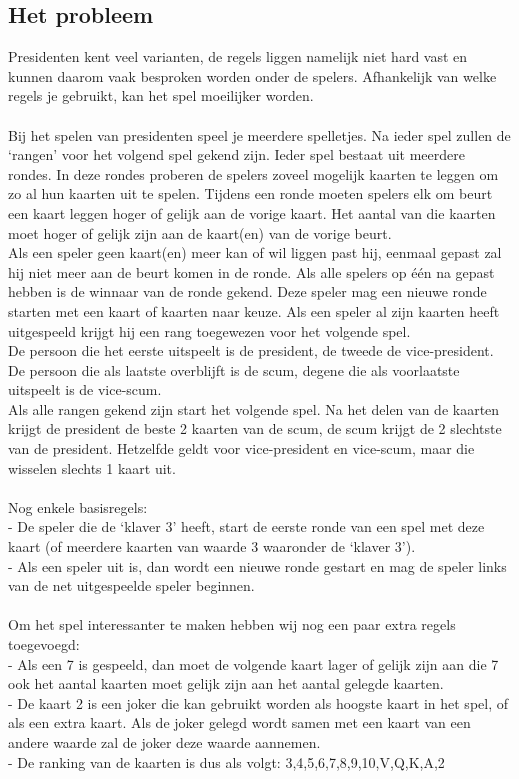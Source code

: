 \documentclass[11pt]{article}
\begin{document}
\subsection{Het probleem}
Presidenten kent veel varianten, de regels liggen namelijk niet hard vast en kunnen daarom vaak besproken worden onder de spelers. Afhankelijk van welke regels je gebruikt, kan het spel moeilijker worden. \\\\
Bij het spelen van presidenten speel je meerdere spelletjes. Na ieder spel zullen de `rangen' voor het volgend spel gekend zijn. Ieder spel bestaat uit meerdere rondes. In deze rondes proberen de spelers zoveel mogelijk kaarten te leggen om zo al hun kaarten uit te spelen. Tijdens een ronde moeten spelers elk om beurt een kaart leggen hoger of gelijk aan de vorige kaart. Het aantal van die kaarten moet hoger of gelijk zijn aan de kaart(en) van de vorige beurt.\\
Als een speler geen kaart(en) meer kan of wil liggen past hij, eenmaal gepast zal hij niet meer aan de beurt komen in de ronde. Als alle spelers op één na gepast hebben is de winnaar van de ronde gekend. Deze speler mag een nieuwe ronde starten met een kaart of kaarten naar keuze. Als een speler al zijn kaarten heeft uitgespeeld krijgt hij een rang toegewezen voor het volgende spel.\\
De persoon die het eerste uitspeelt is de president, de tweede de vice-president.
De persoon die als laatste overblijft is de scum, degene die als voorlaatste uitspeelt is de vice-scum.\\
Als alle rangen gekend zijn start het volgende spel. Na het delen van de kaarten krijgt de president de beste 2 kaarten van de scum, de scum krijgt de 2 slechtste van de president. Hetzelfde geldt voor vice-president en vice-scum, maar die wisselen slechts 1 kaart uit.\\\\
Nog enkele basisregels:\\
- De speler die de ‘klaver 3’ heeft, start de eerste ronde van een spel met deze kaart (of meerdere kaarten van waarde 3 waaronder de `klaver 3'). \\
- Als een speler uit is, dan wordt een nieuwe ronde gestart en mag de speler links van de net uitgespeelde speler beginnen.\\\\
Om het spel interessanter te maken hebben wij nog een paar extra regels toegevoegd:\\
- Als een 7 is gespeeld, dan moet de volgende kaart lager of gelijk zijn aan die 7 ook het aantal kaarten moet gelijk zijn aan het aantal gelegde kaarten.\\
- De kaart 2 is een joker die kan gebruikt worden als hoogste kaart in het spel, of als een extra kaart. Als de joker gelegd wordt samen met een kaart van een andere waarde zal de joker deze waarde aannemen.\\
- De ranking van de kaarten is dus als volgt: 3,4,5,6,7,8,9,10,V,Q,K,A,2\\
\end{document}
